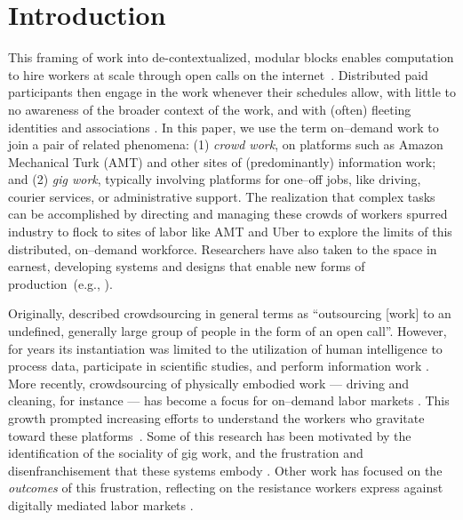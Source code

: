 \documentclass[trackingWork]{subfiles}
\begin{document}
\section{Introduction}\label{sec:introduction}

This framing of work into de-contextualized, modular blocks
enables computation to hire workers at scale through open calls on the internet~\cite{howe2008crowdsourcing,Bigham2014,crowdworkFuture}.
Distributed paid participants then engage in the work whenever their schedules allow,
with little to no awareness of the broader context of the work, and 
with (often) fleeting identities and associations
\cite{martin2014being,uberAlgorithm}.
In this paper, we use the term on--demand work to join a pair of related phenomena:%
(1) \textit{crowd work}, on platforms such as Amazon Mechanical Turk (AMT) and other sites of (predominantly) information work; and
(2) \textit{gig work}, typically involving platforms for one--off jobs, like driving, courier services, or administrative support.
The realization that complex tasks can be accomplished by directing and managing these crowds of workers spurred industry to flock to sites of labor
like AMT and Uber to explore the limits of this distributed, on--demand workforce.
Researchers have also taken to the space in earnest,
developing systems and designs that enable new forms of production~(e.g., \cite{bernsteinSoylent,vizwiz,paolacci2010running}).

Originally, \citeauthor{howe2008crowdsourcing} described crowdsourcing in general terms as
``outsourcing [work] to an undefined, generally large group of people in the form of an open call''.
However, for years its instantiation was limited to the utilization of
human intelligence to process data, participate in scientific studies, and perform information work
\cite{CrowdsourcingUserStudies,movieSummarizationWu,
      yuenSurvey,geiger2011managing,quinnbedersonTaxonomy}.
More recently, crowdsourcing of physically embodied work
--- driving and cleaning, for instance ---
has become a focus for on--demand labor markets
\cite{uberAlgorithm,uberOfficial,zaarlyOfficial,taskrabbitOfficial}.
This growth prompted increasing efforts to understand the workers who gravitate toward these platforms~\cite{Ross,whoareNOTtheTurkers}.
Some of this research has been motivated by the identification of the sociality of gig work,
and the frustration and disenfranchisement that these systems embody
\cite{turkopticon,martin2014being,takingAHITMcInnis}.
Other work has focused on the \textit{outcomes} of this frustration,
reflecting on the resistance workers express against digitally mediated labor markets
\cite{uberAlgorithm,dynamo}.
\end{document}
